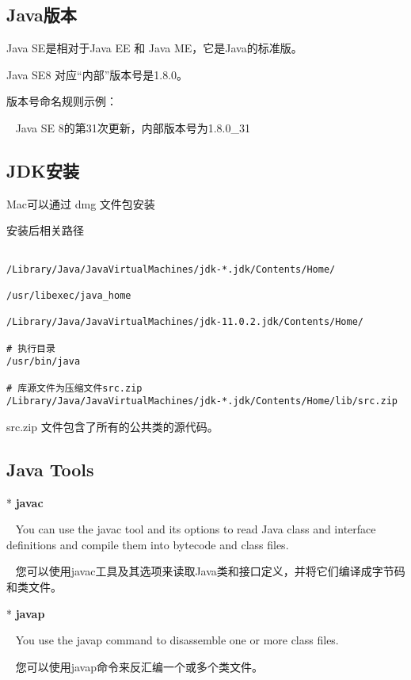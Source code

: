 \subsection{Java版本}

Java SE是相对于Java EE 和 Java ME，它是Java的标准版。

Java SE8 对应“内部”版本号是1.8.0。\newline

版本号命名规则示例：


~ Java SE 8的第31次更新，内部版本号为1.8.0\_31

\subsection{JDK安装}

Mac可以通过 dmg 文件包安装

安装后相关路径

\begin{lstlisting}[style=cshell]

/Library/Java/JavaVirtualMachines/jdk-*.jdk/Contents/Home/

/usr/libexec/java_home

/Library/Java/JavaVirtualMachines/jdk-11.0.2.jdk/Contents/Home/

# 执行目录
/usr/bin/java

# 库源文件为压缩文件src.zip
/Library/Java/JavaVirtualMachines/jdk-*.jdk/Contents/Home/lib/src.zip

\end{lstlisting}


src.zip 文件包含了所有的公共类的源代码。


\subsection{Java Tools}


* \textbf{javac}

~ You can use the javac tool and its options to read Java class and interface definitions and compile them into bytecode and class files.

~ 您可以使用javac工具及其选项来读取Java类和接口定义，并将它们编译成字节码和类文件。

* \textbf{javap}

~ You use the javap command to disassemble one or more class files.

~ 您可以使用javap命令来反汇编一个或多个类文件。

